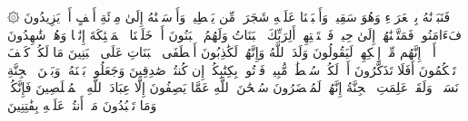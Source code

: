 ۞ فَنَبَذۡنَٰهُ بِٱلۡعَرَاۤءِ وَهُوَ سَقِیمࣱ%
\stopbuffer
\startbuffer[\q:37:146]
وَأَنۢبَتۡنَا عَلَیۡهِ شَجَرَةࣰ مِّن یَقۡطِینࣲ%
\stopbuffer
\startbuffer[\q:37:147]
وَأَرۡسَلۡنَٰهُ إِلَىٰ مِا۟ئَةِ أَلۡفٍ أَوۡ یَزِیدُونَ%
\stopbuffer
\startbuffer[\q:37:148]
فَءَامَنُوا۟ فَمَتَّعۡنَٰهُمۡ إِلَىٰ حِینࣲ%
\stopbuffer
\startbuffer[\q:37:149]
فَٱسۡتَفۡتِهِمۡ أَلِرَبِّكَ ٱلۡبَنَاتُ وَلَهُمُ ٱلۡبَنُونَ%
\stopbuffer
\startbuffer[\q:37:150]
أَمۡ خَلَقۡنَا ٱلۡمَلَٰۤئِكَةَ إِنَٰثࣰا وَهُمۡ شَٰهِدُونَ%
\stopbuffer
\startbuffer[\q:37:151]
أَلَاۤ إِنَّهُم مِّنۡ إِفۡكِهِمۡ لَیَقُولُونَ%
\stopbuffer
\startbuffer[\q:37:152]
وَلَدَ ٱللَّهُ وَإِنَّهُمۡ لَكَٰذِبُونَ%
\stopbuffer
\startbuffer[\q:37:153]
أَصۡطَفَى ٱلۡبَنَاتِ عَلَى ٱلۡبَنِینَ%
\stopbuffer
\startbuffer[\q:37:154]
مَا لَكُمۡ كَیۡفَ تَحۡكُمُونَ%
\stopbuffer
\startbuffer[\q:37:155]
أَفَلَا تَذَكَّرُونَ%
\stopbuffer
\startbuffer[\q:37:156]
أَمۡ لَكُمۡ سُلۡطَٰنࣱ مُّبِینࣱ%
\stopbuffer
\startbuffer[\q:37:157]
فَأۡتُوا۟ بِكِتَٰبِكُمۡ إِن كُنتُمۡ صَٰدِقِینَ%
\stopbuffer
\startbuffer[\q:37:158]
وَجَعَلُوا۟ بَیۡنَهُۥ وَبَیۡنَ ٱلۡجِنَّةِ نَسَبࣰاۚ وَلَقَدۡ عَلِمَتِ ٱلۡجِنَّةُ إِنَّهُمۡ لَمُحۡضَرُونَ%
\stopbuffer
\startbuffer[\q:37:159]
سُبۡحَٰنَ ٱللَّهِ عَمَّا یَصِفُونَ%
\stopbuffer
\startbuffer[\q:37:160]
إِلَّا عِبَادَ ٱللَّهِ ٱلۡمُخۡلَصِینَ%
\stopbuffer
\startbuffer[\q:37:161]
فَإِنَّكُمۡ وَمَا تَعۡبُدُونَ%
\stopbuffer
\startbuffer[\q:37:162]
مَاۤ أَنتُمۡ عَلَیۡهِ بِفَٰتِنِینَ%
\stopbuffer
